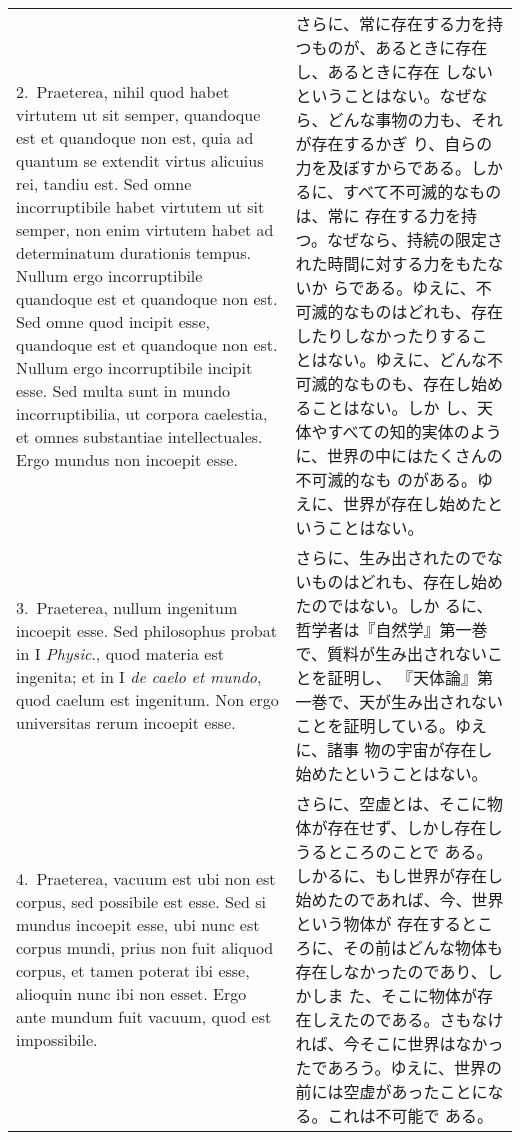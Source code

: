 \documentclass[10pt]{jsarticle} %
\begin{document}
\begin{longtable}{p{21em}p{21em}}

2.~{\sc Praeterea}, nihil quod habet virtutem ut sit
 semper, quandoque est et quandoque non est, quia ad quantum se extendit
 virtus alicuius rei, tandiu est. Sed omne incorruptibile habet virtutem
 ut sit semper, non enim virtutem habet ad determinatum durationis
 tempus. Nullum ergo incorruptibile quandoque est et quandoque non
 est. Sed omne quod incipit esse, quandoque est et quandoque non
 est. Nullum ergo incorruptibile incipit esse. Sed multa sunt in mundo
 incorruptibilia, ut corpora caelestia, et omnes substantiae
 intellectuales. Ergo mundus non incoepit esse.

&

さらに、常に存在する力を持つものが、あるときに存在し、あるときに存在
しないということはない。なぜなら、どんな事物の力も、それが存在するかぎ
り、自らの力を及ぼすからである。しかるに、すべて不可滅的なものは、常に
存在する力を持つ。なぜなら、持続の限定された時間に対する力をもたないか
らである。ゆえに、不可滅的なものはどれも、存在したりしなかったりするこ
とはない。ゆえに、どんな不可滅的なものも、存在し始めることはない。しか
し、天体やすべての知的実体のように、世界の中にはたくさんの不可滅的なも
のがある。ゆえに、世界が存在し始めたということはない。

\\


3.~{\sc Praeterea}, nullum ingenitum incoepit esse. Sed philosophus probat in I
 {\itshape Physic}., quod materia est ingenita; et in I {\itshape de caelo et mundo}, quod
 caelum est ingenitum. Non ergo universitas rerum incoepit esse.

&

さらに、生み出されたのでないものはどれも、存在し始めたのではない。しか
るに、哲学者は『自然学』第一巻で、質料が生み出されないことを証明し、
『天体論』第一巻で、天が生み出されないことを証明している。ゆえに、諸事
物の宇宙が存在し始めたということはない。


\\

4.~{\sc Praeterea}, vacuum est ubi non est corpus, sed possibile est esse. Sed
 si mundus incoepit esse, ubi nunc est corpus mundi, prius non fuit
 aliquod corpus, et tamen poterat ibi esse, alioquin nunc ibi non
 esset. Ergo ante mundum fuit vacuum, quod est impossibile.

&

さらに、空虚とは、そこに物体が存在せず、しかし存在しうるところのことで
ある。しかるに、もし世界が存在し始めたのであれば、今、世界という物体が
存在するところに、その前はどんな物体も存在しなかったのであり、しかしま
た、そこに物体が存在しえたのである。さもなければ、今そこに世界はなかっ
たであろう。ゆえに、世界の前には空虚があったことになる。これは不可能で
ある。



\end{longtable}
\end{document}
